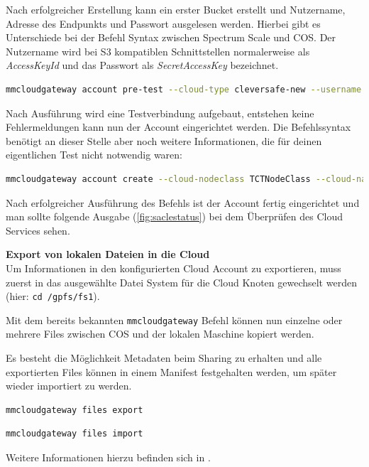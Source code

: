 Nach erfolgreicher Erstellung kann ein erster Bucket erstellt und Nutzername, Adresse des Endpunkts und Passwort ausgelesen werden. Hierbei gibt es Unterschiede bei der Befehl Syntax zwischen Spectrum Scale und \ac{COS}. 
Der Nutzername wird bei S3 kompatiblen Schnittstellen normalerweise als \textit{AccessKeyId} und das Passwort als \textit{SecretAccessKey} bezeichnet.\\

\begin{lstlisting}[language=bash, caption=Vortest des Cloud Sharing Accounts]
mmcloudgateway account pre-test --cloud-type cleversafe-new --username "<username>" --pwd-file <path/file/your/secretAccessKey> --cloud-url <cos/endpoint>
\end{lstlisting}

Nach Ausführung wird eine Testverbindung aufgebaut, entstehen keine Fehlermeldungen kann nun der Account eingerichtet werden. Die Befehlssyntax benötigt an dieser Stelle aber noch weitere Informationen, die für deinen eigentlichen Test nicht notwendig waren:\\

\begin{lstlisting}[language=bash, caption=Einrichtung des Cloud Sharing Accounts]
mmcloudgateway account create --cloud-nodeclass TCTNodeClass --cloud-name mcstore --cloud-type cleversafe-new --username "<username>" --pwd-file <path/file/your/secretAccessKey> --enable TRUE --cloud-url <cos/endpoint>
\end{lstlisting}

Nach erfolgreicher Ausführung des Befehls ist der Account fertig eingerichtet und man sollte folgende Ausgabe (\autoref{fig:saclestatus}) bei dem Überprüfen des Cloud Services sehen.

\textbf{Export von lokalen Dateien in die Cloud}\\
Um Informationen in den konfigurierten Cloud Account zu exportieren, muss zuerst in das ausgewählte Datei System für die Cloud Knoten gewechselt werden (hier: \lstinline|cd /gpfs/fs1|).

Mit dem bereits bekannten \lstinline|mmcloudgateway| Befehl können nun einzelne oder mehrere Files zwischen \ac{COS} und der lokalen Maschine kopiert werden.

Es besteht die Möglichkeit Metadaten beim Sharing zu erhalten und alle exportierten Files können in einem Manifest festgehalten werden, um später wieder importiert zu werden.

\begin{lstlisting}[language=bash, caption=Export von lokalen Dateien]
mmcloudgateway files export
\end{lstlisting}

\begin{lstlisting}[language=bash, caption=Import von COS Dateien]
mmcloudgateway files import
\end{lstlisting}

Weitere Informationen hierzu befinden sich in \cite[S. 613]{ibmadmin.2017}.

